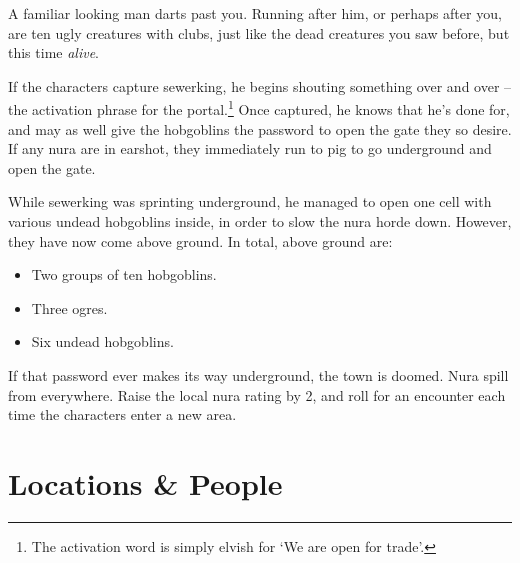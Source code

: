 \begin{multicols}{2}
\begin{speechtext}

	A familiar looking man darts past you.
	Running after him, or perhaps after you, are ten ugly creatures with clubs, just like the dead creatures you saw before, but this time \emph{alive}.

\end{speechtext}


If the characters capture \gls{sewerking}, he begins shouting something over and over -- the activation phrase for the portal.\footnote{The activation word is simply elvish for `We are open for trade'.}  Once captured, he knows that he's done for, and may as well give the hobgoblins the password to open the gate they so desire.  If any nura are in earshot, they immediately run to \gls{pig} to go underground and open the gate.

While \gls{sewerking} was sprinting underground, he managed to open one cell with various undead hobgoblins inside, in order to slow the nura horde down.  However, they have now come above ground.  In total, above ground are:

\begin{itemize}

	\item{Two groups of ten hobgoblins.}
	\item{Three ogres.}
	\item{Six undead hobgoblins.}

\end{itemize}


If that password ever makes its way underground, the town is doomed.
Nura spill from everywhere.
Raise the local nura rating by 2, and roll for an encounter each time the characters enter a new area.

\end{multicols}

\stopcontents[Town]
\stopcontents[sq]

\section{Locations \& People}

